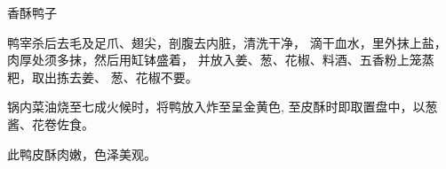 \begin{recipe}{香酥鸭子}

\ingredients


\cooking

\step 鸭宰杀后去毛及足爪、翅尖，剖腹去内脏，清洗干净， 滴干血水，里外抹上盐，肉厚处须多抹，然后用缸钵盛着， 并放入姜、葱、花椒、料酒、五香粉上笼蒸粑，取出拣去姜、 葱、花椒不要。

\step 锅内菜油烧至七成火候时，将鸭放入炸至呈金黄色, 至皮酥时即取置盘中，以葱酱、花卷佐食。

\notes

此鸭皮酥肉嫩，色泽美观。

\end{recipe}

